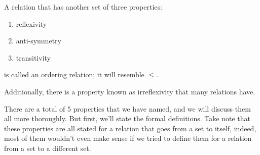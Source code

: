 A relation that has another set of three properties:

\begin{enumerate}
\item {}reflexivity 
\item {}anti-symmetry 
\item {}transitivity
\end{enumerate}

\noindent is called an ordering relation; it will resemble $\leq$.

Additionally, there is a property known as irreflexivity that many
relations have.

There are a total of 5 properties that we have named, and we will discuss
them all more thoroughly.  But first, we'll state the formal definitions.
Take note that these properties are all stated for a relation that goes
from a set to itself, indeed, most of them wouldn't even make sense if
we tried to define them for a relation from a set to a different set.

\clearpage

